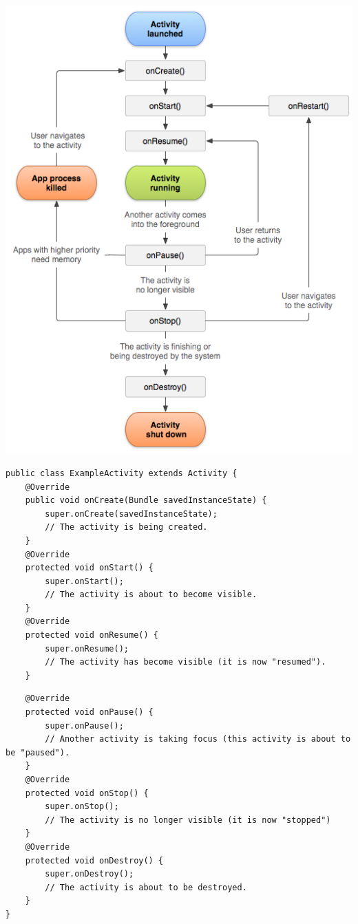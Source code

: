 \documentclass{beamer}
\begin{document}
\begin{frame}
\begin{center}
\includegraphics[scale=0.3]{activity_lifecycle.png}
\end{center}

\end{frame}
\lstset{language=java}
\begin{frame}[fragile]
\begin{lstlisting}
public class ExampleActivity extends Activity {
    @Override
    public void onCreate(Bundle savedInstanceState) {
        super.onCreate(savedInstanceState);
        // The activity is being created.
    }
    @Override
    protected void onStart() {
        super.onStart();
        // The activity is about to become visible.
    }
    @Override
    protected void onResume() {
        super.onResume();
        // The activity has become visible (it is now "resumed").
    }
\end{lstlisting}
\end{frame}
\begin{frame}[fragile]
\begin{lstlisting}
    @Override
    protected void onPause() {
        super.onPause();
        // Another activity is taking focus (this activity is about to be "paused").
    }
    @Override
    protected void onStop() {
        super.onStop();
        // The activity is no longer visible (it is now "stopped")
    }
    @Override
    protected void onDestroy() {
        super.onDestroy();
        // The activity is about to be destroyed.
    }
}
\end{lstlisting}

\end{frame}
\end{document}
